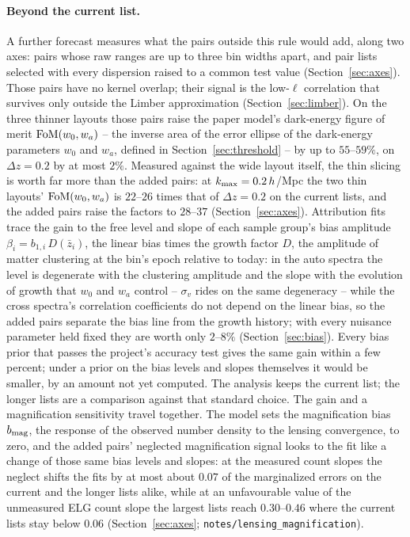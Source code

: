 \documentclass[11pt]{article}
\newcommand{\sv}{\sigma_v}
\newcommand{\us}{\_\allowbreak}
\begin{document}
\paragraph{Beyond the current list.}
A further forecast measures what the pairs outside this rule would
add, along two axes: pairs whose raw ranges are up to three bin widths
apart, and pair lists selected with every dispersion raised to a
common test value (Section~\ref{sec:axes}).  Those pairs have no
kernel overlap; their signal is the low-$\ell$ correlation that
survives only outside the Limber approximation
(Section~\ref{sec:limber}).  On the three thinner
layouts those pairs raise the paper model's dark-energy figure of
merit ${\rm FoM}(w_0, w_a)$ -- the inverse area of the error ellipse
of the dark-energy parameters $w_0$ and $w_a$, defined in
Section~\ref{sec:threshold} -- by
up to $55$--$59\%$, on $\Delta z = 0.2$ by at most $2\%$.  Measured
against the wide layout itself, the thin slicing is worth far more
than the added pairs: at $k_{\rm max} = 0.2\,h$/Mpc the two thin
layouts' ${\rm FoM}(w_0, w_a)$ is $22$--$26$ times that of
$\Delta z = 0.2$ on the current lists, and the added pairs raise the
factors to $28$--$37$ (Section~\ref{sec:axes}).  Attribution
fits trace the gain to the free level and slope of each sample
group's bias amplitude $\beta_i = b_{1,i}\,D(\bar{z}_i)$, the linear
bias times the growth factor $D$, the amplitude of matter clustering
at the bin's epoch relative to today: in the auto spectra the level is
degenerate with the clustering amplitude and the slope with the
evolution of growth that $w_0$ and $w_a$ control -- $\sv$ rides on
the same degeneracy -- while the cross spectra's correlation
coefficients do not depend on the linear bias, so the added pairs
separate the bias line from the growth history; with every nuisance
parameter held fixed they are worth only $2$--$8\%$
(Section~\ref{sec:bias}).  Every bias prior that passes the
project's accuracy test gives the same gain within a few percent;
under a prior on the bias levels and slopes themselves it would be
smaller, by an amount not yet computed.  The analysis keeps the
current list; the longer lists are a comparison against that
standard choice.  The gain and a magnification sensitivity travel
together.  The model sets the magnification bias $b_{\rm mag}$, the
response of the observed number density to the lensing convergence,
to zero, and the added pairs' neglected magnification signal looks
to the fit like a change of those same bias levels and slopes: at
the measured count slopes the neglect shifts the fits by at most
about $0.07$ of the marginalized errors on the current and the
longer lists alike, while at an unfavourable value of the unmeasured
ELG count slope the largest lists reach $0.30$--$0.46$ where the
current lists stay below $0.06$ (Section~\ref{sec:axes};
\texttt{notes/lensing\us magnification}).
\end{document}
